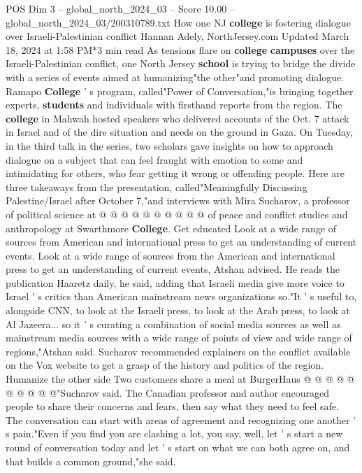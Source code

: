 \begin{textsample}{POS Dim 3 – global\_north\_2024\_03 – Score 10.00 – global\_north\_2024\_03/200310789.txt}  \label{ex:f3_pos_276}
How one NJ \textbf{college} is fostering dialogue over Israeli-Palestinian conflict Hannan Adely, NorthJersey.com Updated March 18, 2024 at 1:58 PM*3 min read As tensions flare on \textbf{college} \textbf{campuses} over the Israeli-Palestinian conflict, one North Jersey \textbf{school} is trying to bridge the divide with a series of events aimed at humanizing"the other"and promoting dialogue.
Ramapo \textbf{College} ' s program, called"Power of Conversation,"is bringing together experts, \textbf{students} and individuals with firsthand reports from the region.
The \textbf{college} in Mahwah hosted speakers who delivered accounts of the Oct. 7 attack in Israel and of the dire situation and needs on the ground in Gaza.
On Tuesday, in the third talk in the series, two scholars gave insights on how to approach dialogue on a subject that can feel fraught with emotion to some and intimidating for others, who fear getting it wrong or offending people.
Here are three takeaways from the presentation, called"Meaningfully Discussing Palestine/Israel after October 7,"and interviews with Mira Sucharov, a professor of political science at @ @ @ @ @ @ @ @ @ @ of peace and conflict studies and anthropology at Swarthmore \textbf{College}.
Get educated Look at a wide range of sources from American and international press to get an understanding of current events.
Look at a wide range of sources from the American and international press to get an understanding of current events, Atshan advised.
He reads the publication Haaretz daily, he said, adding that Israeli media give more voice to Israel ' s critics than American mainstream news organizations so."It ' s useful to, alongside CNN, to look at the Israeli press, to look at the Arab press, to look at Al Jazeera... so it ' s curating a combination of social media sources as well as mainstream media sources with a wide range of points of view and wide range of regions,"Atshan said.
Sucharov recommended explainers on the conflict available on the Vox website to get a grasp of the history and politics of the region.
Humanize the other side Two customers share a meal at BurgerHaus @ @ @ @ @ @ @ @ @ @"Sucharov said.
The Canadian professor and author encouraged people to share their concerns and fears, then say what they need to feel safe.
The conversation can start with areas of agreement and recognizing one another ' s pain."Even if you find you are clashing a lot, you say, well, let ' s start a new round of conversation today and let ' s start on what we can both agree on, and that builds a common ground,"she said.

\end{textsample}
